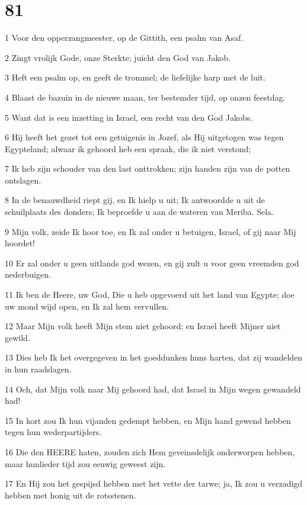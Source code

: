 \chapter{81}

\par 1 Voor den opperzangmeester, op de Gittith, een psalm van Asaf.
\par 2 Zingt vrolijk Gode, onze Sterkte; juicht den God van Jakob.
\par 3 Heft een psalm op, en geeft de trommel; de liefelijke harp met de luit.
\par 4 Blaast de bazuin in de nieuwe maan, ter bestemder tijd, op onzen feestdag.
\par 5 Want dat is een inzetting in Israel, een recht van den God Jakobs.
\par 6 Hij heeft het gezet tot een getuigenis in Jozef, als Hij uitgetogen was tegen Egypteland; alwaar ik gehoord heb een spraak, die ik niet verstond;
\par 7 Ik heb zijn schouder van den last onttrokken; zijn handen zijn van de potten ontslagen.
\par 8 In de benauwdheid riept gij, en Ik hielp u uit; Ik antwoordde u uit de schuilplaats des donders; Ik beproefde u aan de wateren van Meriba. Sela.
\par 9 Mijn volk, zeide Ik hoor toe, en Ik zal onder u betuigen, Israel, of gij naar Mij hoordet!
\par 10 Er zal onder u geen uitlands god wezen, en gij zult u voor geen vreemden god nederbuigen.
\par 11 Ik ben de Heere, uw God, Die u heb opgevoerd uit het land van Egypte; doe uw mond wijd open, en Ik zal hem vervullen.
\par 12 Maar Mijn volk heeft Mijn stem niet gehoord; en Israel heeft Mijner niet gewild.
\par 13 Dies heb Ik het overgegeven in het goeddunken huns harten, dat zij wandelden in hun raadslagen.
\par 14 Och, dat Mijn volk naar Mij gehoord had, dat Israel in Mijn wegen gewandeld had!
\par 15 In kort zou Ik hun vijanden gedempt hebben, en Mijn hand gewend hebben tegen hun wederpartijders.
\par 16 Die den HEERE haten, zouden zich Hem geveinsdelijk onderworpen hebben, maar hunlieder tijd zou eeuwig geweest zijn.
\par 17 En Hij zou het gespijsd hebben met het vette der tarwe; ja, Ik zou u verzadigd hebben met honig uit de rotsstenen.


